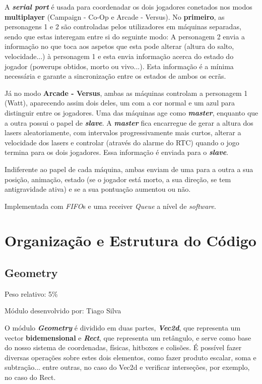 \documentclass{report}
\begin{document}
A \textbf{\textit{serial port}} é usada para coordenadar os dois jogadores conetados nos modos \textbf{multiplayer} (Campaign - Co-Op e Arcade - Versus). No \textbf{primeiro}, as personagens 1 e 2 são controladas pelos utilizadores em máquinas separadas, sendo que estas interegam entre si do seguinte modo: A personagem 2 envia a informação no que toca aos aspetos que esta pode alterar (altura do salto, velocidade...) à personagem 1 e esta envia informação acerca do estado do jogador (powerups obtidos, morto ou vivo...). Esta informação é a mínima necessária e garante a sincronização entre os estados de ambos os ecrãs.

Já no modo \textbf{Arcade - Versus}, ambas as máquinas controlam a personagem 1 (Watt), aparecendo assim dois deles, um com a cor normal e um azul para distinguir entre os jogadores. Uma das máquinas age como \textbf{\textit{master}}, enquanto que a outra possui o papel de \textbf{\textit{slave}}. A \textbf{\textit{master}} fica encarregue de gerar a altura dos lasers aleatoriamente, com intervalos progressivamente mais curtos, alterar a velocidade dos lasers e controlar (através do alarme do RTC) quando o jogo termina para os dois jogadores. Essa informação é enviada para o \textbf{\textit{slave}}. 

Indiferente ao papel de cada máquina, ambas enviam de uma para a outra a sua posição, animação, estado (se o jogador está morto, a sua direção, se tem antigravidade ativa) e se a sua pontuação aumentou ou não.

Implementada com \textit{FIFO}s e uma receiver \textit{Queue} a nível de \textit{software}.

\chapter{Organização e Estrutura do Código}

\section{Geometry}

Peso relativo: 5\%

Módulo desenvolvido por: Tiago Silva
\newline

O módulo \textbf{\textit{Geometry}} é dividido em duas partes, \textbf{\textit{Vec2d}}, que representa um vector \textbf{bidemensional} e \textbf{\textit{Rect}}, que representa um retângulo, e serve como base do nosso sistema de coordenadas, físicas, hitboxes e colisões. É possível fazer diversas operações sobre estes dois elementos, como fazer produto escalar, soma e subtração... entre outras, no caso do Vec2d e verificar interseções, por exemplo, no caso do Rect.
\end{document}
